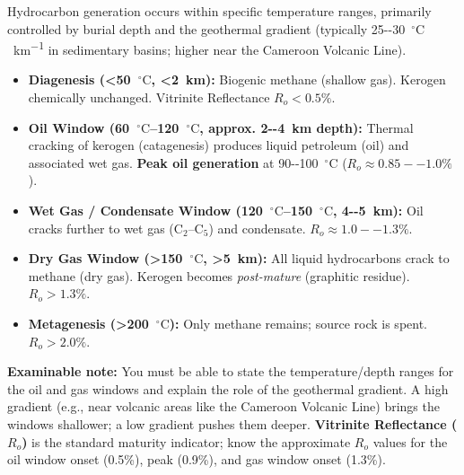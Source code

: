 \documentclass[11pt]{article}
\newcommand{\cle}[1]{{\popxbold\color{popdark}#1}}
\begin{document}
\begin{propriete}
Hydrocarbon generation occurs within specific temperature ranges, primarily controlled by burial depth and the \cle{geothermal gradient} (typically \SI{25--30}{\ensuremath{{}^{\circ}\mathrm{C}}\per\kilo\meter} in sedimentary basins; higher near the Cameroon Volcanic Line).
\begin{itemize}
    \item \textbf{Diagenesis (\textless \SI{50}{\ensuremath{{}^{\circ}\mathrm{C}}}, \textless \SI{2}{\kilo\meter}):} Biogenic methane (shallow gas). Kerogen chemically unchanged. Vitrinite Reflectance $R_o < 0.5\%$.
    \item \textbf{Oil Window (\SIrange{60}{120}{\ensuremath{{}^{\circ}\mathrm{C}}}, approx. \SI{2--4}{\kilo\meter} depth):} Thermal cracking of kerogen (catagenesis) produces liquid petroleum (oil) and associated wet gas. \textbf{Peak oil generation} at \SI{90--100}{\ensuremath{{}^{\circ}\mathrm{C}}} ($R_o \approx 0.85--1.0\%$).
    \item \textbf{Wet Gas / Condensate Window (\SIrange{120}{150}{\ensuremath{{}^{\circ}\mathrm{C}}}, \SI{4--5}{\kilo\meter}):} Oil cracks further to wet gas (C$_2$--C$_5$) and condensate. $R_o \approx 1.0--1.3\%$.
    \item \textbf{Dry Gas Window (\textgreater \SI{150}{\ensuremath{{}^{\circ}\mathrm{C}}}, \textgreater \SI{5}{\kilo\meter}):} All liquid hydrocarbons crack to methane (dry gas). Kerogen becomes \emph{post-mature} (graphitic residue). $R_o > 1.3\%$.
    \item \textbf{Metagenesis (\textgreater \SI{200}{\ensuremath{{}^{\circ}\mathrm{C}}}):} Only methane remains; source rock is spent. $R_o > 2.0\%$.
\end{itemize}
\textbf{Examinable note:} You must be able to state the temperature/depth ranges for the oil and gas windows and explain the role of the geothermal gradient. A high gradient (e.g., near volcanic areas like the Cameroon Volcanic Line) brings the windows shallower; a low gradient pushes them deeper. \textbf{Vitrinite Reflectance ($R_o$)} is the standard maturity indicator; know the approximate $R_o$ values for the oil window onset (0.5\%), peak (0.9\%), and gas window onset (1.3\%).
\end{propriete}
\end{document}
